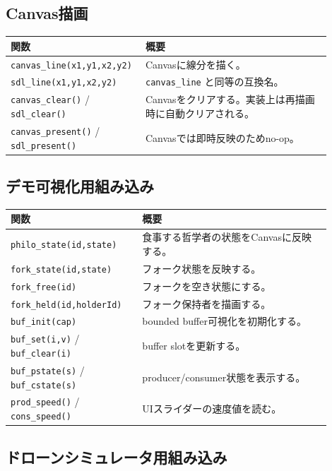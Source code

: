 \documentclass[11pt,a4paper,uplatex,dvipdfmx]{jsarticle}
\begin{document}
\subsection{Canvas描画}

\begin{longtable}{p{0.34\linewidth}p{0.56\linewidth}}
\toprule
関数 & 概要 \\
\midrule
\texttt{canvas\_line(x1,y1,x2,y2)} & Canvasに線分を描く。 \\
\texttt{sdl\_line(x1,y1,x2,y2)} & \texttt{canvas\_line} と同等の互換名。 \\
\texttt{canvas\_clear()} / \texttt{sdl\_clear()} & Canvasをクリアする。実装上は再描画時に自動クリアされる。 \\
\texttt{canvas\_present()} / \texttt{sdl\_present()} & Canvasでは即時反映のためno-op。 \\
\bottomrule
\end{longtable}

\subsection{デモ可視化用組み込み}

\begin{longtable}{p{0.36\linewidth}p{0.54\linewidth}}
\toprule
関数 & 概要 \\
\midrule
\texttt{philo\_state(id,state)} & 食事する哲学者の状態をCanvasに反映する。 \\
\texttt{fork\_state(id,state)} & フォーク状態を反映する。 \\
\texttt{fork\_free(id)} & フォークを空き状態にする。 \\
\texttt{fork\_held(id,holderId)} & フォーク保持者を描画する。 \\
\texttt{buf\_init(cap)} & bounded buffer可視化を初期化する。 \\
\texttt{buf\_set(i,v)} / \texttt{buf\_clear(i)} & buffer slotを更新する。 \\
\texttt{buf\_pstate(s)} / \texttt{buf\_cstate(s)} & producer/consumer状態を表示する。 \\
\texttt{prod\_speed()} / \texttt{cons\_speed()} & UIスライダーの速度値を読む。 \\
\bottomrule
\end{longtable}

\subsection{ドローンシミュレータ用組み込み}
\end{document}
